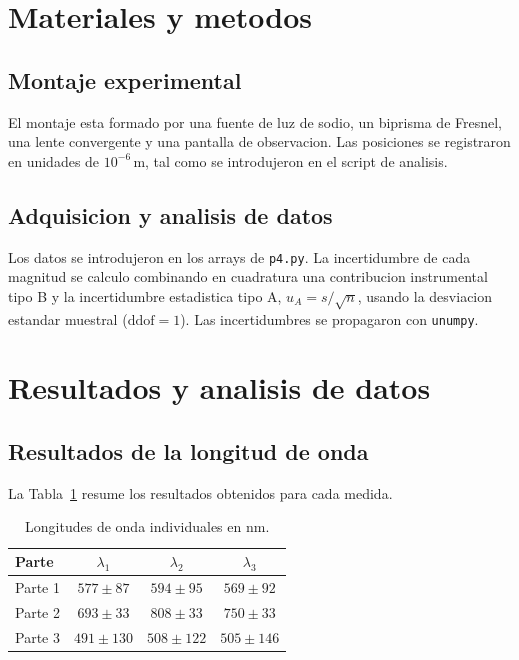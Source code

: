 \documentclass[a4paper,11pt]{article}
\begin{document}
\section{Materiales y metodos}

\subsection{Montaje experimental}
El montaje esta formado por una fuente de luz de sodio, un biprisma de Fresnel,
una lente convergente y una pantalla de observacion. Las posiciones se registraron
en unidades de $10^{-6}\,\mathrm{m}$, tal como se introdujeron en el script de analisis.

\subsection{Adquisicion y analisis de datos}
Los datos se introdujeron en los arrays de \texttt{p4.py}. La incertidumbre de
cada magnitud se calculo combinando en cuadratura una contribucion instrumental
tipo B y la incertidumbre estadistica tipo A, $u_A=s/\sqrt{n}$, usando la desviacion
estandar muestral ($\mathrm{ddof}=1$). Las incertidumbres se propagaron con
\texttt{unumpy}.

\section{Resultados y analisis de datos}

\subsection{Resultados de la longitud de onda}
La Tabla~\ref{tab:lambda} resume los resultados obtenidos para cada medida.

\begin{table}[H]
\centering
\begin{tabular}{lccc}
\toprule
\textbf{Parte} & $\lambda_1$ & $\lambda_2$ & $\lambda_3$ \\
\midrule
Parte 1 & $577\pm87$ & $594\pm95$ & $569\pm92$ \\
Parte 2 & $693\pm33$ & $808\pm33$ & $750\pm33$ \\
Parte 3 & $491\pm130$ & $508\pm122$ & $505\pm146$ \\
\bottomrule
\end{tabular}
\caption{Longitudes de onda individuales en nm.}
\label{tab:lambda}
\end{table}
\end{document}
